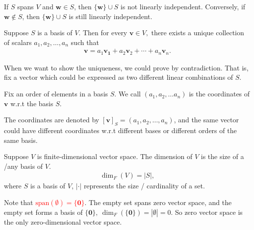 \documentclass[12pt]{article}
\begin{document}
\begin{pbox}
\begin{remark}
 If $S$ spans $V$ and $\mathbf{w}\in S$, then $\{\mathbf{w}\}\cup S$ is not linearly independent.
 Conversely, if $\mathbf{w}\notin S$, then $\{\mathbf{w}\}\cup S$ is still linearly independent.
\end{remark}
\end{pbox}



\begin{theorem}
    Suppose $S$ is a basis of $V$.
    Then for every $\mathbf{v}\in V,$ there exists a unique collection of scalars $a_1,a_2,\ldots,a_n$ such that
    \begin{align*}
        \mathbf{v}=a_1\mathbf{v_1}+a_2\mathbf{v}_2+\cdots+a_n\mathbf{v}_n.  
    \end{align*}
\end{theorem}
\begin{tcolorbox}[boxrule=0.5pt]
\begin{pf}
When we want to show the uniqueness, we could prove by contradiction.
That is, fix a vector which could be expressed as two different linear combinations of $S$.
\end{pf}
\end{tcolorbox}

\begin{definition}
    Fix an order of elements in a basis $S$.
    We call $(a_1,a_2,\ldots a_n)$ is the coordinates of $\mathbf{v}$ w.r.t the basis $S$.
\end{definition}

The coordinates are denoted by $[\mathbf{v}]_S = (a_1,a_2,\ldots, a_n)$,
and the same vector could have different coordinates w.r.t different bases or
different orders of the same basis.


\begin{definition}[Dimension]
    Suppose $V$ is finite-dimensional vector space.
    The dimension of $V$ is the size of a /any basis of $V$.
    \begin{align*}
        \dim_F(V) = |S|,
    \end{align*}
where $S$ is a basis of $V$, $|\cdot|$ represents the size / cardinality of a set.
\end{definition}

Note that \textcolor{red}{$\text{span}(\emptyset)=\{\mathbf{0}\}$}.
The empty set spans zero vector space, and the empty set forms a basis of $\{\mathbf{0}\},\ \dim_F(\{\mathbf{0}\})=|\emptyset|=0$.
So zero vector space is the only zero-dimensional vector space.
\end{document}
